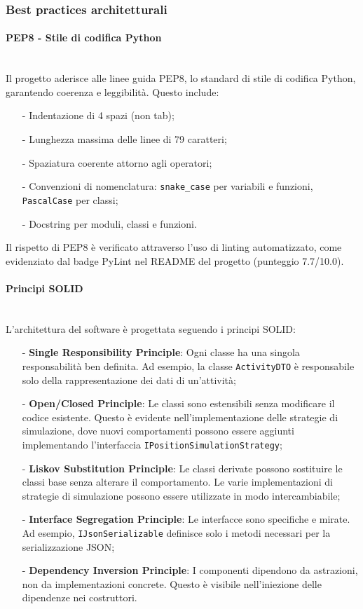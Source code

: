 \documentclass[10pt]{article}
\newcommand{\myparagraph}[1]{\paragraph{#1}\mbox{}\\}
\begin{document}
    \subsubsection{Best practices architetturali}
    \myparagraph{PEP8 - Stile di codifica Python}
    Il progetto aderisce alle linee guida PEP8, lo standard di stile di codifica Python, garantendo coerenza e leggibilità. Questo include:
    \begin{itemize}
        \item[-] Indentazione di 4 spazi (non tab);
        \item[-] Lunghezza massima delle linee di 79 caratteri;
        \item[-] Spaziatura coerente attorno agli operatori;
        \item[-] Convenzioni di nomenclatura: \texttt{snake\_case} per variabili e funzioni, \texttt{PascalCase} per classi;
        \item[-] Docstring per moduli, classi e funzioni.
    \end{itemize}
    Il rispetto di PEP8 è verificato attraverso l'uso di linting automatizzato, come evidenziato dal badge PyLint nel README del progetto (punteggio 7.7/10.0).
    
    \myparagraph{Principi SOLID}
    L'architettura del software è progettata seguendo i principi SOLID:
    \begin{itemize}
        \item[-] \textbf{Single Responsibility Principle}: Ogni classe ha una singola responsabilità ben definita. Ad esempio, la classe \texttt{ActivityDTO} è responsabile solo della rappresentazione dei dati di un'attività;
        \item[-] \textbf{Open/Closed Principle}: Le classi sono estensibili senza modificare il codice esistente. Questo è evidente nell'implementazione delle strategie di simulazione, dove nuovi comportamenti possono essere aggiunti implementando l'interfaccia \texttt{IPositionSimulationStrategy};
        \item[-] \textbf{Liskov Substitution Principle}: Le classi derivate possono sostituire le classi base senza alterare il comportamento. Le varie implementazioni di strategie di simulazione possono essere utilizzate in modo intercambiabile;
        \item[-] \textbf{Interface Segregation Principle}: Le interfacce sono specifiche e mirate. Ad esempio, \texttt{IJsonSerializable} definisce solo i metodi necessari per la serializzazione JSON;
        \item[-] \textbf{Dependency Inversion Principle}: I componenti dipendono da astrazioni, non da implementazioni concrete. Questo è visibile nell'iniezione delle dipendenze nei costruttori.
    \end{itemize}
\end{document}
